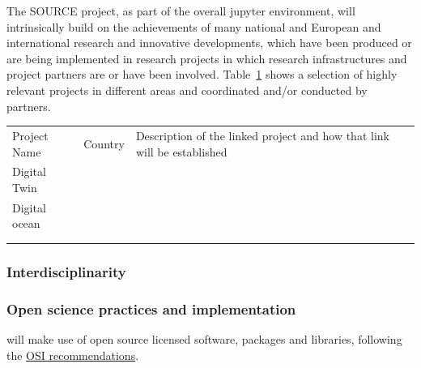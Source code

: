 The SOURCE project, as part of the overall jupyter environment, will intrinsically build on the achievements of many national and European and international research and innovative developments, which have been produced or are being implemented in research projects in which research infrastructures and project partners are or have been involved.
Table~\ref{tab:national-research} shows a selection of highly relevant projects in different areas and coordinated and/or conducted by \TheProject partners.



\begin{table}[]
\label{tab:national-research}
\begin{tabular}{lll}
\rowcolor[HTML]{00D2CB}

Project Name  & Country & Description of the linked project and how that link will be established \\
Digital Twin  &         &                                                                         \\
Digital ocean &         &                                                                         \\
              &         &                                                                         \\
              &         &

\end{tabular}
\end{table}




\subsubsection{Interdisciplinarity}

\TOWRITE{}{}

\subsubsection{Open science practices and implementation}

\TheProject will make use of open source licensed software, packages and libraries, following the \href{https://opensource.org/licenses}{OSI recommendations}.

